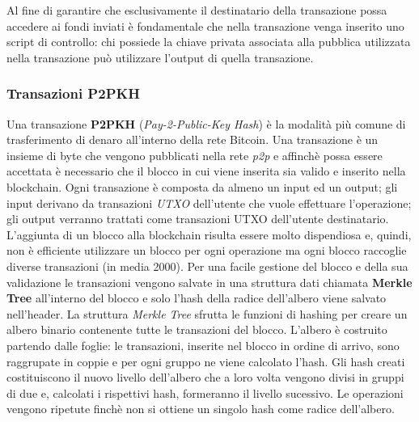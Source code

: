 Al fine di garantire che esclusivamente il destinatario della transazione possa accedere ai fondi inviati è fondamentale che nella transazione venga inserito uno script di controllo: chi possiede la chiave privata associata alla pubblica utilizzata nella transazione può utilizzare l'output di quella transazione.

\subsubsection{Transazioni P2PKH}\label{sec:transazione}
Una transazione \textbf{P2PKH} (\textit{Pay-2-Public-Key Hash}) è la modalità più comune di trasferimento di denaro all'interno della rete Bitcoin.
Una transazione è un insieme di byte che vengono pubblicati nella rete \textit{p2p} e affinchè possa essere accettata è necessario che il blocco in cui viene inserita sia valido e inserito nella blockchain.
Ogni transazione è composta da almeno un input ed un output; gli input derivano da transazioni \textit{UTXO} dell'utente che vuole effettuare l'operazione; gli output verranno trattati come transazioni UTXO dell'utente destinatario.\newline
L'aggiunta di un blocco alla blockchain risulta essere molto dispendiosa e, quindi, non è efficiente utilizzare un blocco per ogni operazione ma ogni blocco raccoglie diverse transazioni (in media 2000). Per una facile gestione del blocco e della sua validazione le transazioni vengono salvate in una struttura dati chiamata \textbf{Merkle Tree} all'interno del blocco e solo l'hash della radice dell'albero viene salvato nell'header.\newline
La struttura \textit{Merkle Tree} sfrutta le funzioni di hashing per creare un albero binario contenente tutte le transazioni del blocco.\newline
L'albero è costruito partendo dalle foglie: le transazioni, inserite nel blocco in ordine di arrivo, sono raggrupate in coppie e per ogni gruppo ne viene calcolato l'hash. Gli hash creati costituiscono il nuovo livello dell'albero che a loro volta vengono divisi in gruppi di due e, calcolati i rispettivi hash, formeranno il livello sucessivo.
Le operazioni vengono ripetute finchè non si ottiene un singolo hash come radice dell'albero.\newline
